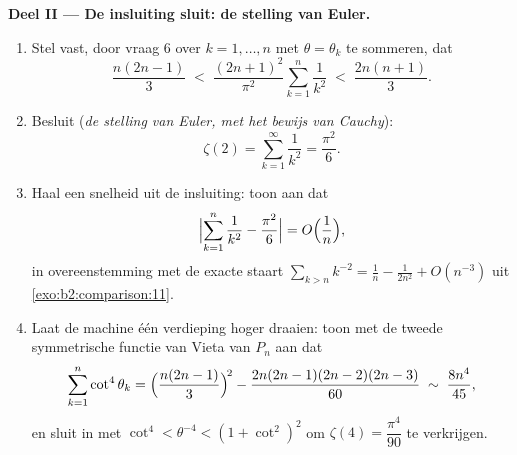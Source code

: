 \begin{problem}[{Weekendopgave --- $\zeta(2) = \pi^2/6$ en het
panorama van Bertrand}]
\medskip
\noindent\textbf{Deel II --- De insluiting sluit: de stelling van
Euler.}
\begin{enumerate}[resume]
  \item Stel vast, door vraag 6 over $k = 1, \dots, n$ met $\theta
        = \theta_k$ te sommeren, dat
        \[
        \frac{n(2n-1)}{3} \;<\;
        \frac{(2n+1)^2}{\pi^2}\sum_{k=1}^{n}\frac1{k^2}
        \;<\; \frac{2n(n+1)}{3}.
        \]
  \item Besluit (\emph{de stelling van Euler, met het bewijs van
        Cauchy}):
        \[
        \zeta(2) = \sum_{k=1}^{\infty}\frac{1}{k^2} =
        \frac{\pi^2}{6}.
        \]
  \item Haal een snelheid uit de insluiting: toon aan dat
        \[
        \Bigl|\sum_{k=1}^{n}\frac1{k^2} - \frac{\pi^2}6\Bigr|
        = O\Bigl(\frac1n\Bigr),
        \]
        in overeenstemming met de exacte staart $\sum_{k>n}k^{-2}
        = \frac1n - \frac{1}{2n^2} + O(n^{-3})$ uit
        \cref{exo:b2:comparison:11}.
  \item Laat de machine één verdieping hoger draaien: toon met de
        tweede symmetrische functie van Vieta van $P_n$ aan dat
        \[
        \sum_{k=1}^{n}\cot^4\theta_k =
        \Bigl(\frac{n(2n-1)}3\Bigr)^{\!2} -
        \frac{2n(2n-1)(2n-2)(2n-3)}{60}
        \;\sim\; \frac{8n^4}{45},
        \]
        en sluit in met $\cot^4 < \theta^{-4} < (1 + \cot^2)^2$
        om $\zeta(4) = \dfrac{\pi^4}{90}$ te verkrijgen.
\end{enumerate}


\end{problem}
